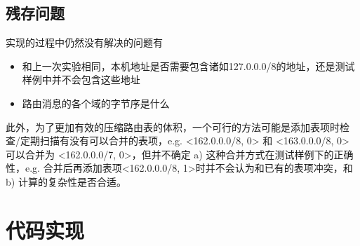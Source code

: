 \documentclass{article}
\begin{document}
\subsection{残存问题}

实现的过程中仍然没有解决的问题有
\begin{itemize}
    \item 和上一次实验相同，本机地址是否需要包含诸如127.0.0.0/8的地址，还是测试样例中并不会包含这些地址
    \item 路由消息的各个域的字节序是什么
\end{itemize}

此外，为了更加有效的压缩路由表的体积，一个可行的方法可能是添加表项时检查/定期扫描有没有可以合并的表项，e.g. <162.0.0.0/8, 0> 和 <163.0.0.0/8, 0> 可以合并为 <162.0.0.0/7, 0>，但并不确定 a) 这种合并方式在测试样例下的正确性，e.g. 合并后再添加表项<162.0.0.0/8, 1>时并不会认为和已有的表项冲突，和 b) 计算的复杂性是否合适。



\section{代码实现}



\lstset{breaklines}
\lstset{extendedchars=false}
\end{document}
